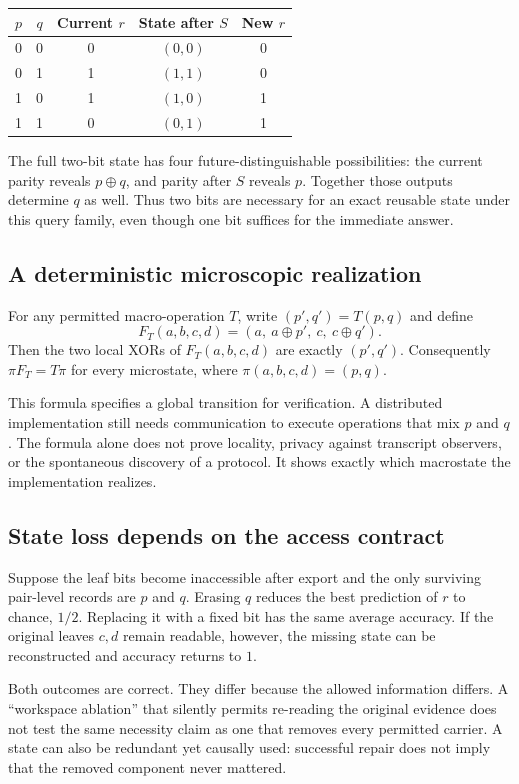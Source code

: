 \documentclass[11pt,letterpaper]{article}
\theoremstyle{plain}
\theoremstyle{definition}
\theoremstyle{remark}
\begin{document}
\begin{center}
\begin{tabular}{@{}ccccc@{}}
\toprule
$p$ & $q$ & Current $r$ & State after $S$ & New $r$\\
\midrule
0&0&0&$(0,0)$&0\\
0&1&1&$(1,1)$&0\\
1&0&1&$(1,0)$&1\\
1&1&0&$(0,1)$&1\\
\bottomrule
\end{tabular}
\end{center}

The full two-bit state has four future-distinguishable possibilities: the current parity reveals $p\oplus q$, and parity after $S$ reveals $p$. Together those outputs determine $q$ as well. Thus two bits are necessary for an exact reusable state under this query family, even though one bit suffices for the immediate answer.

\subsection{A deterministic microscopic realization}
For any permitted macro-operation $T$, write $(p',q')=T(p,q)$ and define
\[
F_T(a,b,c,d)=(a,\ a\oplus p',\ c,\ c\oplus q').
\]
Then the two local XORs of $F_T(a,b,c,d)$ are exactly $(p',q')$. Consequently $\pi F_T=T\pi$ for every microstate, where $\pi(a,b,c,d)=(p,q)$.

This formula specifies a global transition for verification. A distributed implementation still needs communication to execute operations that mix $p$ and $q$. The formula alone does not prove locality, privacy against transcript observers, or the spontaneous discovery of a protocol. It shows exactly which macrostate the implementation realizes.

\subsection{State loss depends on the access contract}
Suppose the leaf bits become inaccessible after export and the only surviving pair-level records are $p$ and $q$. Erasing $q$ reduces the best prediction of $r$ to chance, $1/2$. Replacing it with a fixed bit has the same average accuracy. If the original leaves $c,d$ remain readable, however, the missing state can be reconstructed and accuracy returns to $1$.

Both outcomes are correct. They differ because the allowed information differs. A ``workspace ablation'' that silently permits re-reading the original evidence does not test the same necessity claim as one that removes every permitted carrier. A state can also be redundant yet causally used: successful repair does not imply that the removed component never mattered.
\end{document}
